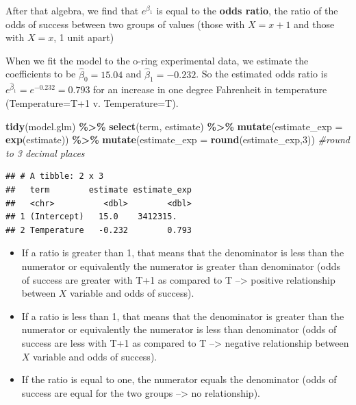 \documentclass[
]{book}
\newenvironment{Shaded}{\begin{snugshade}}{\end{snugshade}}
\newcommand{\AttributeTok}[1]{\textcolor[rgb]{0.13,0.29,0.53}{#1}}
\newcommand{\CommentTok}[1]{\textcolor[rgb]{0.56,0.35,0.01}{\textit{#1}}}
\newcommand{\DecValTok}[1]{\textcolor[rgb]{0.00,0.00,0.81}{#1}}
\newcommand{\FunctionTok}[1]{\textcolor[rgb]{0.13,0.29,0.53}{\textbf{#1}}}
\newcommand{\NormalTok}[1]{#1}
\newcommand{\SpecialCharTok}[1]{\textcolor[rgb]{0.81,0.36,0.00}{\textbf{#1}}}
\begin{document}
After that algebra, we find that \(e^{\beta_1}\) is equal to the \textbf{odds ratio}, the ratio of the odds of success between two groups of values (those with \(X=x+1\) and those with \(X=x\), 1 unit apart)

When we fit the model to the o-ring experimental data, we estimate the coefficients to be \(\hat{\beta}_0 = 15.04\) and \(\hat{\beta}_1 = -0.232\). So the estimated odds ratio is \(e^{\hat{\beta}_1} = e^{-0.232} = 0.793\) for an increase in one degree Fahrenheit in temperature (Temperature=T+1 v. Temperature=T).

\begin{Shaded}
\begin{Highlighting}[]
\FunctionTok{tidy}\NormalTok{(model.glm) }\SpecialCharTok{\%\textgreater{}\%}
  \FunctionTok{select}\NormalTok{(term, estimate) }\SpecialCharTok{\%\textgreater{}\%}
  \FunctionTok{mutate}\NormalTok{(}\AttributeTok{estimate\_exp =} \FunctionTok{exp}\NormalTok{(estimate)) }\SpecialCharTok{\%\textgreater{}\%}
  \FunctionTok{mutate}\NormalTok{(}\AttributeTok{estimate\_exp =} \FunctionTok{round}\NormalTok{(estimate\_exp,}\DecValTok{3}\NormalTok{)) }\CommentTok{\#round to 3 decimal places}
\end{Highlighting}
\end{Shaded}

\begin{verbatim}
## # A tibble: 2 x 3
##   term        estimate estimate_exp
##   <chr>          <dbl>        <dbl>
## 1 (Intercept)   15.0    3412315.   
## 2 Temperature   -0.232        0.793
\end{verbatim}

\begin{itemize}
\item
  If a ratio is greater than 1, that means that the denominator is less than the numerator or equivalently the numerator is greater than denominator (odds of success are greater with T+1 as compared to T --\textgreater{} positive relationship between \(X\) variable and odds of success).
\item
  If a ratio is less than 1, that means that the denominator is greater than the numerator or equivalently the numerator is less than denominator (odds of success are less with T+1 as compared to T --\textgreater{} negative relationship between \(X\) variable and odds of success).
\item
  If the ratio is equal to one, the numerator equals the denominator (odds of success are equal for the two groups --\textgreater{} no relationship).
\end{itemize}
\end{document}

